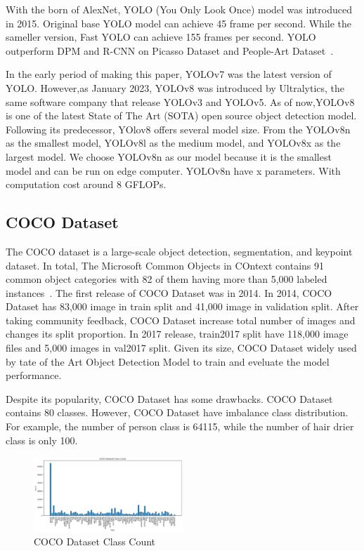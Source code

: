 \documentclass[conference]{IEEEtran}
\begin{document}
With the born of AlexNet, YOLO (You Only Look Once) model was introduced in 2015. Original base YOLO model can achieve 45 frame per second.
While the sameller version, Fast YOLO can achieve 155 frames per second.
YOLO outperform DPM and R-CNN on Picasso Dataset and People-Art Dataset~\cite{You Only Look Once}.

In the early period of making this paper, YOLOv7 was the latest version of YOLO\@.
However,as January 2023, YOLOv8 was introduced by Ultralytics, the same software company that release YOLOv3 and YOLOv5. 
As of now,YOLOv8 is one of the latest State of The Art (SOTA) open source object detection model. Following its predecessor, YOlov8 offers several model size.
From the YOLOv8n as the smallest model, YOLOv8l as the medium model, and YOLOv8x as the largest model.
We choose YOLOv8n as our model because it is the smallest model and can be run on edge computer.
YOLOv8n have x parameters. With computation cost around 8 GFLOPs.
\subsection{COCO Dataset}\label{AA}
The COCO dataset is a large-scale object detection, segmentation, and keypoint dataset.
In total, The Microsoft Common Objects in COntext contains 91 common object categories with 82 of them having more than 5,000 labeled instances~\cite{COCO Dataset}.
The first release of COCO Dataset was in 2014. In 2014, COCO Dataset has 83,000 image in train split and 41,000 image in validation split.
After taking community feedback, COCO Dataset increase total number of images and changes its split proportion. In 2017 release, train2017 split have 118,000 image files and 5,000 images in val2017 split.
Given its size, COCO Dataset widely used by tate of the Art Object Detection Model to train and eveluate the model performance.

Despite its popularity, COCO Dataset has some drawbacks. COCO Dataset contains 80 classes. However, COCO Dataset have imbalance class distribution.
For example, the number of person class is 64115, while the number of hair drier class is only 100.
\begin{figure}[h]
\centering
\includegraphics[width=0.5\textwidth,keepaspectratio]{coco_class_count.png}
\caption{COCO Dataset Class Count}
\end{figure}
\end{document}
